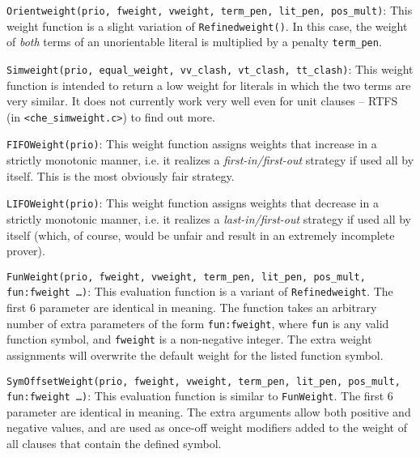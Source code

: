 \documentclass{report}
\begin{document}
\medskip
\begin{sloppypar}
\noindent{}\texttt{Orientweight(prio, fweight, vweight,
    term\_pen, lit\_pen, pos\_mult)}: This weight function is a
slight variation of \texttt{Refinedweight()}. In this case, the weight
of \emph{both} terms of an unorientable literal is multiplied by a
penalty \texttt{term\_pen}.
\end{sloppypar}

\medskip
\begin{sloppypar}
\noindent{}\texttt{Simweight(prio, equal\_weight,
  vv\_clash, vt\_clash, tt\_clash)}: This weight function is intended
to return a low weight for literals in which the two terms are very
similar. It does not currently work very well even for unit clauses --
RTFS (in \texttt{<che\_simweight.c>}) to find out more.
\end{sloppypar}

\medskip
\begin{sloppypar}
\noindent{}\texttt{FIFOWeight(prio)}:
This weight function assigns weights that increase in a strictly
monotonic manner, i.e. it realizes a \emph{first-in/first-out}
strategy if used all by itself. This is the most obviously fair
strategy.
\end{sloppypar}

\medskip
\begin{sloppypar}
\noindent{}\texttt{LIFOWeight(prio)}:
This weight function assigns weights that decrease in a strictly
monotonic manner, i.e. it realizes a \emph{last-in/first-out}
strategy if used all by itself (which, of course, would be unfair and
result in an extremely incomplete prover).
\end{sloppypar}

\medskip
\begin{sloppypar}
  \noindent{}\texttt{FunWeight(prio, fweight, vweight,
    term\_pen, lit\_pen, pos\_mult, fun:fweight \ldots)}:
  This evaluation function is a variant of \texttt{Refinedweight}. The
  first 6 parameter are identical in meaning. The function takes an
  arbitrary number of extra parameters of the form
  \texttt{fun:fweight}, where \texttt{fun} is any valid function
  symbol, and \texttt{fweight} is a non-negative integer. The extra
  weight assignments will overwrite the default weight for the listed
  function symbol.
\end{sloppypar}

\medskip
\begin{sloppypar}
  \noindent{}\texttt{SymOffsetWeight(prio, fweight, vweight,
    term\_pen, lit\_pen, pos\_mult, fun:fweight \ldots)}:
  This evaluation function is similar to \texttt{FunWeight}. The first
  6 parameter are identical in meaning.  The extra arguments allow
  both positive and negative values, and are used as once-off weight
  modifiers added to the weight of all clauses that contain the
  defined symbol.
\end{sloppypar}
\end{document}
